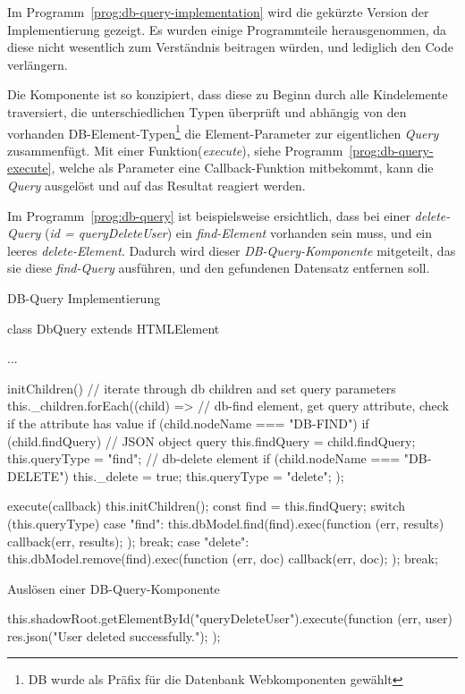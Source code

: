 Im Programm~\ref{prog:db-query-implementation} wird die gekürzte Version der Implementierung gezeigt. Es wurden einige Programmteile herausgenommen, da diese nicht wesentlich zum Verständnis beitragen würden, und lediglich den Code verlängern.

Die Komponente ist so konzipiert, dass diese zu Beginn durch alle Kindelemente traversiert, die unterschiedlichen Typen überprüft und abhängig von den vorhanden DB-Element-Typen\footnote{DB wurde als Präfix für die Datenbank Webkomponenten gewählt} die Element-Parameter zur eigentlichen \textit{Query} zusammenfügt. Mit einer Funktion(\textit{execute}), siehe Programm~\ref{prog:db-query-execute}, welche als Parameter eine Callback-Funktion mitbekommt, kann die  \textit{Query} ausgelöst und auf das Resultat reagiert werden.

Im Programm~\ref{prog:db-query} ist beispielsweise ersichtlich, dass bei einer \textit{delete-Query} (\textit{id = queryDeleteUser}) ein \textit{find-Element} vorhanden sein muss, und ein leeres \textit{delete-Element}. Dadurch wird dieser \textit{DB-Query-Komponente} mitgeteilt, das sie diese \textit{find-Query} ausführen, und den gefundenen Datensatz entfernen soll.
\begin{program}
	\caption{DB-Query Implementierung}
	\label{prog:db-query-implementation}
	\begin{HtmlCode}
 class DbQuery extends HTMLElement {
	 	
	 	{...}
	 	
	 	initChildren(){
	 		// iterate through db children and set query parameters
	 		this._children.forEach((child) => {
	 			// db-find element, get query attribute, check if the attribute has value
	 			if (child.nodeName === "DB-FIND") {
	 				if (child.findQuery) // JSON object query
	 				{
	 					this.findQuery = child.findQuery;
	 				}
	 				this.queryType = "find";
	 			}
	 			// db-delete element
	 			if (child.nodeName === "DB-DELETE") {
	 				this._delete = true;
	 				this.queryType = "delete";
	 			}
	 		});
	 	}
	 	
	 	execute(callback){
	 		this.initChildren();
	 		const find = this.findQuery;
	 		switch (this.queryType) {
	 			case "find":
		 			this.dbModel.find(find).exec(function (err, results) {
		 				callback(err, results);
		 			});
	 			break;
	 			case "delete":
		 			this.dbModel.remove(find).exec(function (err, doc) {
		 				callback(err, doc);
		 			});
	 			break;
	 		}
	 	}
 }
\end{HtmlCode}
\end{program}

\begin{program}
\caption{Auslösen einer DB-Query-Komponente}
\label{prog:db-query-execute}
\begin{HtmlCode}
this.shadowRoot.getElementById("queryDeleteUser").execute(function (err, user) {
	res.json("User deleted successfully.");
});
\end{HtmlCode}
\end{program}
